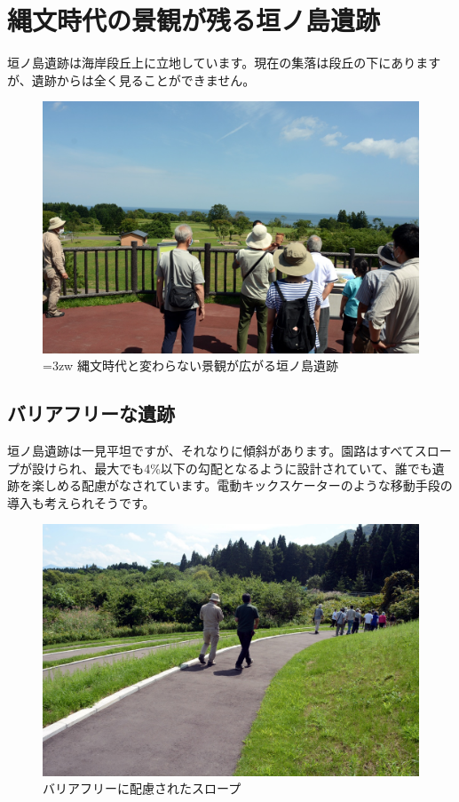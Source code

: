 \documentclass[a4j,11pt,twocolumn,openany]{jsbook}
\begin{document}
\section{縄文時代の景観が残る垣ノ島遺跡}

垣ノ島遺跡は海岸段丘上に立地しています。現在の集落は段丘の下にありますが、遺跡からは全く見ることができません。

\begin{figure}[ht]
	\centering
	\includegraphics[width=\linewidth]{fig/01_Iseki_kengaku/12_Kakinosima_zenkei.JPG}
	\caption{\hangindent=3zw
		縄文時代と変わらない景観が広がる垣ノ島遺跡}
	\label{}
\end{figure}

\subsection{バリアフリーな遺跡}

垣ノ島遺跡は一見平坦ですが、それなりに傾斜があります。園路はすべてスロープが設けられ、最大でも4\%以下の勾配となるように設計されていて、誰でも遺跡を楽しめる配慮がなされています。電動キックスケーターのような移動手段の導入も考えられそうです。

\begin{figure}[ht]
	\centering
	\includegraphics[width=\linewidth]{fig/01_Iseki_kengaku/13Kakinosima_slope.JPG}
	\caption{バリアフリーに配慮されたスロープ}
	\label{}
\end{figure}
\end{document}
